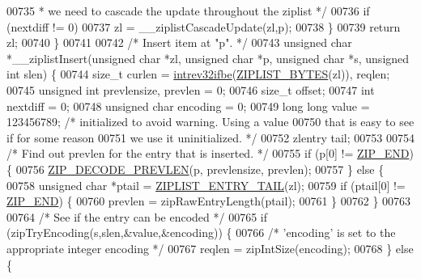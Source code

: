 \begin{DoxyCode}
{{00735 \textcolor{comment}{         * we need to cascade the update throughout the ziplist */}
00736         \textcolor{keywordflow}{if} (nextdiff != 0)
00737             zl = \_\_ziplistCascadeUpdate(zl,p);
00738     \}
00739     \textcolor{keywordflow}{return} zl;
00740 \}
00741 
00742 \textcolor{comment}{/* Insert item at "p". */}
00743 \textcolor{keywordtype}{unsigned} \textcolor{keywordtype}{char} *\_\_ziplistInsert(\textcolor{keywordtype}{unsigned} \textcolor{keywordtype}{char} *zl, \textcolor{keywordtype}{unsigned} \textcolor{keywordtype}{char} *p, \textcolor{keywordtype}{unsigned} \textcolor{keywordtype}{char} *s, \textcolor{keywordtype}{unsigned} \textcolor{keywordtype}{int} 
      slen) \{
00744     size\_t curlen = \hyperlink{endianconv_8h_a4e85d9ae58a3b1e6ceaabfd4689002c7}{intrev32ifbe}(\hyperlink{ziplist_8c_a28b9c7884758bc2d52f204903a4bb642}{ZIPLIST\_BYTES}(zl)), reqlen;
00745     \textcolor{keywordtype}{unsigned} \textcolor{keywordtype}{int} prevlensize, prevlen = 0;
00746     size\_t offset;
00747     \textcolor{keywordtype}{int} nextdiff = 0;
00748     \textcolor{keywordtype}{unsigned} \textcolor{keywordtype}{char} encoding = 0;
00749     \textcolor{keywordtype}{long} \textcolor{keywordtype}{long} value = 123456789; \textcolor{comment}{/* initialized to avoid warning. Using a value}
00750 \textcolor{comment}{                                    that is easy to see if for some reason}
00751 \textcolor{comment}{                                    we use it uninitialized. */}
00752     zlentry tail;
00753 
00754     \textcolor{comment}{/* Find out prevlen for the entry that is inserted. */}
00755     \textcolor{keywordflow}{if} (p[0] != \hyperlink{ziplist_8c_a31a8f9d5b5bad75318741cfca5de5ea8}{ZIP\_END}) \{
00756         \hyperlink{ziplist_8c_a3e5b2bc4707dc1097db2726494cc3728}{ZIP\_DECODE\_PREVLEN}(p, prevlensize, prevlen);
00757     \} \textcolor{keywordflow}{else} \{
00758         \textcolor{keywordtype}{unsigned} \textcolor{keywordtype}{char} *ptail = \hyperlink{ziplist_8c_a13a02cab4315ab94186102584601273e}{ZIPLIST\_ENTRY\_TAIL}(zl);
00759         \textcolor{keywordflow}{if} (ptail[0] != \hyperlink{ziplist_8c_a31a8f9d5b5bad75318741cfca5de5ea8}{ZIP\_END}) \{
00760             prevlen = zipRawEntryLength(ptail);
00761         \}
00762     \}
00763 
00764     \textcolor{comment}{/* See if the entry can be encoded */}
00765     \textcolor{keywordflow}{if} (zipTryEncoding(s,slen,&value,&encoding)) \{
00766         \textcolor{comment}{/* 'encoding' is set to the appropriate integer encoding */}
00767         reqlen = zipIntSize(encoding);
00768     \} \textcolor{keywordflow}{else} \{
}}
\end{DoxyCode}
